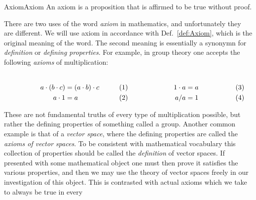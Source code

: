         \begin{fdefinition}{Axiom}{Axiom}
            An \gls{axiom} is a \gls{proposition} that is affirmed to be true
            without \gls{proof}.
        \end{fdefinition}
        There are two uses of the word \textit{axiom} in mathematics, and
        unfortunately they are different. We will use axiom in accordance with
        Def.~\ref{def:Axiom}, which is the original meaning of the word. The
        second meaning is essentially a synonymn for \textit{definition} or
        \textit{defining properties}. For example, in group theory one accepts
        the following \textit{axioms} of multiplication:
        \par
        \begin{subequations}
            \begin{minipage}[b]{0.49\textwidth}
                \begin{align}
                    a\cdot(b\cdot{c})&=(a\cdot{b})\cdot{c}\\
                    a\cdot{1}&=a
                \end{align}
            \end{minipage}
            \hfill
            \begin{minipage}[b]{0.49\textwidth}
                \begin{align}
                    1\cdot{a}&=a\\
                    a/a&=1
                \end{align}
            \end{minipage}
        \end{subequations}
        \par\vspace{2.5ex}
        These are not fundamental truths of every type of multiplication
        possible, but rather the defining properties of something called a
        group. Another common example is that of a \textit{vector space}, where
        the defining properties are called the \textit{axioms of vector spaces}.
        To be consistent with mathematical vocabulary this collection of
        properties should be called the \textit{definition} of vector spaces. If
        presented with some mathematical object one must then prove it
        satisfies the various properties, and then we may use the theory of
        vector spaces freely in our investigation of this object. This is
        contrasted with actual axioms which we take to always be true in every
